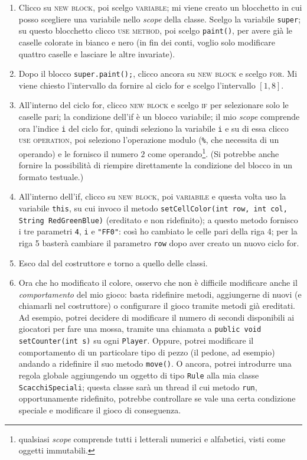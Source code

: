 \begin{enumerate}
	\item Clicco su \textsc{new block}, poi scelgo \textsc{variable}; mi viene creato un blocchetto in cui posso scegliere una variabile nello \emph{scope} della classe. Scelgo la variabile \texttt{super}; su questo blocchetto clicco \textsc{use method}, poi scelgo \texttt{paint()}, per avere già le caselle colorate in bianco e nero (in fin dei conti, voglio solo modificare quattro caselle e lasciare le altre invariate).
	\item Dopo il blocco \texttt{super.paint();}, clicco ancora su \textsc{new block} e scelgo \textsc{for}. Mi viene chiesto l'intervallo da fornire al ciclo for e scelgo l'intervallo $[1, 8]$.
	\item All'interno del ciclo for, clicco \textsc{new block} e scelgo \textsc{if} per selezionare solo le caselle pari; la condizione dell'if è un blocco variabile; il mio \emph{scope} comprende ora l'indice \texttt{i} del ciclo for, quindi seleziono la variabile \texttt{i} e su di essa clicco \textsc{use operation}, poi seleziono l'operazione modulo (\texttt{\%}, che necessita di un operando) e le fornisco il numero $2$ come operando\footnote{qualsiasi \emph{scope} comprende tutti i letterali numerici e alfabetici, visti come oggetti immutabili.}. (Si potrebbe anche fornire la possibilità di riempire direttamente la condizione del blocco in un formato testuale.) %
	\item All'interno dell'if, clicco su \textsc{new block}, poi \textsc{variabile} e questa volta uso la variabile \texttt{this}, su cui invoco il metodo \texttt{setCellColor(int row, int col, String RedGreenBlue)} (ereditato e non ridefinito); a questo metodo fornisco i tre parametri \texttt{4}, \texttt{i} e \texttt{"FF0"}: così ho cambiato le celle pari della riga 4; per la riga 5 basterà cambiare il parametro \texttt{row} dopo aver creato un nuovo ciclo for.
	\item Esco dal  del costruttore e torno a quello delle classi.
	\item Ora che ho modificato il colore, osservo che non è difficile modificare anche il \emph{comportamento} del mio gioco: basta ridefinire metodi, aggiungerne di nuovi (e chiamarli nel costruttore) o configurare il gioco tramite metodi già ereditati. Ad esempio, potrei decidere di modificare il numero di secondi disponibili ai giocatori per fare una mossa, tramite una chiamata a \texttt{public void setCounter(int s)} su ogni \texttt{Player}. Oppure, potrei modificare il comportamento di un particolare tipo di pezzo (il pedone, ad esempio) andando a ridefinire il suo metodo \texttt{move()}. O ancora, potrei introdurre una regola globale aggiungendo un oggetto di tipo \texttt{Rule} alla mia classe \texttt{ScacchiSpeciali}; questa classe sarà un thread il cui metodo \texttt{run}, opportunamente ridefinito, potrebbe controllare se vale una certa condizione speciale e modificare il gioco di conseguenza.

\end{enumerate}
